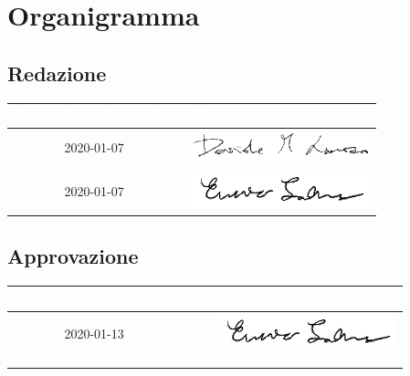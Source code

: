 \section{Organigramma}
\subsection{Redazione}
{
	\renewcommand{\arraystretch}{2}
	\begin{longtable}{ C{5cm} C{4cm} C{5cm} }
		\textcolor{white}{\textbf{Nome}} & \textcolor{white}{\textbf{Data di redazione}} & \textcolor{white}{\textbf{Firma}}\\	\endhead
        
        \LD{} & 2020-01-07 &
        \includegraphics[scale=0.60]{Sezioni/Firme/Davide.png}  \\
        \SE{} & 2020-01-07 &
        \includegraphics[scale=0.70]{Sezioni/Firme/Enrico.png}  \\
        		
	\end{longtable}
}

\subsection{Approvazione}
{
	\renewcommand{\arraystretch}{2}
	\centering
	\begin{longtable}{ C{5cm} C{4cm} C{5cm} }
		\textcolor{white}{\textbf{Nome}} & \textcolor{white}{\textbf{Data di Approvazione}} & \textcolor{white}{\textbf{Firma}}\\	\endhead
		
		
		\SE{} & 2020-01-13 &  
		\includegraphics[scale=0.70]{Sezioni/Firme/Enrico.png}\\
		\VT{} &  & \\
		\CR{} & &  \\
		
	\end{longtable}
}

